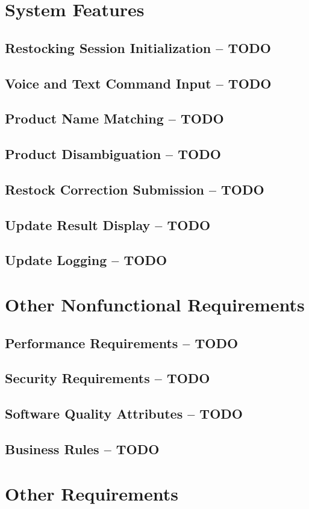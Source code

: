 \documentclass{scrreprt}
\begin{document}
\chapter{System Features}

\section{Restocking Session Initialization -- TODO}

\section{Voice and Text Command Input -- TODO}

\section{Product Name Matching -- TODO}

\section{Product Disambiguation -- TODO}

\section{Restock Correction Submission -- TODO}

\section{Update Result Display -- TODO}

\section{Update Logging -- TODO}


\chapter{Other Nonfunctional Requirements}

\section{Performance Requirements -- TODO}

\section{Security Requirements -- TODO}

\section{Software Quality Attributes -- TODO}

\section{Business Rules -- TODO}

\chapter{Other Requirements}
\end{document}
